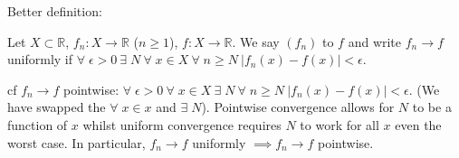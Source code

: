     Better definition:
    \begin{definition}
        Let $X \subset \mathbb{R}$, $f_n : X \to \mathbb{R}$ ($n \geq 1$), $f: X \to \mathbb{R}$.
        We say $(f_n)$  to $f$ and write $f_n \to f$ uniformly if $\forall \; \epsilon > 0 \ \exists \; N \ \forall \; x \in X \ \forall \; n \geq N \ |f_n(x) - f(x)| < \epsilon$.
    \end{definition} 

    cf $f_n \to f$ pointwise: $\forall \; \epsilon > 0 \ \forall \; x \in X \ \exists \; N \ \forall \; n \geq N \ |f_n(x) - f(x)| < \epsilon$. (We have swapped the $\forall \; x \in x$ and $\exists \; N$).
    Pointwise convergence allows for $N$ to be a function of $x$ whilst uniform convergence requires $N$ to work for all $x$ even the worst case.
    In particular, $f_n \to f$ uniformly $\implies f_n \to f$ pointwise.

